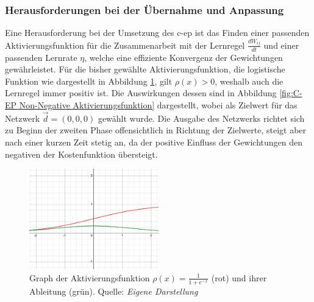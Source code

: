 \subsubsection{Herausforderungen bei der Übernahme und Anpassung}
\label{chap:Herausforderungen bei der Übernahme und Anpassung}

Eine Herausforderung bei der Umsetzung des \gls{c-ep} ist das Finden einer passenden Aktivierungsfunktion für die Zusammenarbeit mit der Lernregel \(\frac{dW_{ij}}{dt}\) und einer passenden Lernrate \(\eta\), welche eine effiziente Konvergenz der Gewichtungen gewährleistet. Für die bisher gewählte Aktivierungsfunktion, die logistische Funktion wie dargestellt in Abbildung \ref{fig:Graph der Aktivierungsfunktion}, gilt \(\rho(x) > 0\), weshalb auch die Lernregel immer positiv ist. Die Auswirkungen dessen sind in Abbildung \ref{fig:C-EP Non-Negative Aktivierungsfunktion} dargestellt, wobei als Zielwert für das Netzwerk \(\vec{d}=(0,0,0)\) gewählt wurde. Die Ausgabe des Netzwerks richtet sich zu Beginn der zweiten Phase offensichtlich in Richtung der Zielwerte, steigt aber nach einer kurzen Zeit stetig an, da der positive Einfluss der Gewichtungen den negativen der Kostenfunktion übersteigt.

\begin{figure}[h]
  \includegraphics[width=0.5\textwidth]{abbildungen/sigmoid_funktion.png}
  \caption{Graph der Aktivierungsfunktion \(\rho(x)=\frac{1}{1+e^{-x}}\) (rot) und ihrer Ableitung (grün). Quelle: \textit{Eigene Darstellung}}
  \label{fig:Graph der Aktivierungsfunktion}
\end{figure}

